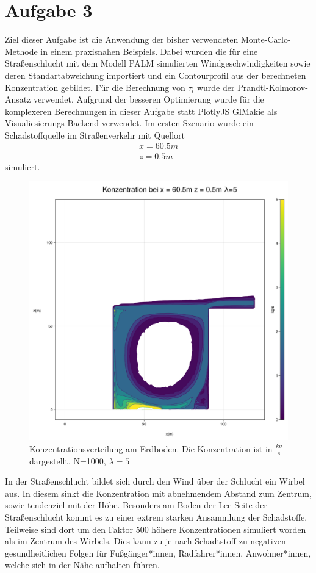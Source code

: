 \documentclass[ngerman]{scrartcl}
\begin{document}
\section{Aufgabe  3}
Ziel dieser Aufgabe ist die Anwendung der bisher verwendeten Monte-Carlo-Methode in einem praxisnahen Beispiels. Dabei wurden die für eine Straßenschlucht mit dem Modell PALM simulierten Windgeschwindigkeiten sowie deren Standartabweichung importiert und ein Contourprofil aus der berechneten Konzentration gebildet. Für die Berechnung von $\tau_l$ wurde der Prandtl-Kolmorov-Ansatz verwendet. Aufgrund der besseren Optimierung wurde für die komplexeren Berechnungen in dieser Aufgabe statt PlotlyJS  GlMakie als Visualiesierungs-Backend verwendet.
Im ersten Szenario wurde ein Schadstoffquelle im Straßenverkehr mit Quellort 
\begin{align}
	x=60.5 \si{m} \\
	z= 0.5 \si{m} 
\end{align}
simuliert.
\begin{figure}[H]
	\centering
	\includegraphics[scale=0.25]{Bilder/3_single_x = 60.5.png}
	\caption{Konzentrationsverteilung am Erdboden. Die Konzentration ist in $\frac{\si{kg}}{\si{s}}$ dargestellt. N=1000, $\lambda =5$}
	\label{fig:my_label}
\end{figure}
In der Straßenschlucht bildet sich durch den Wind über der Schlucht ein Wirbel aus. In diesem sinkt die Konzentration mit abnehmendem Abstand zum Zentrum, sowie tendenziel mit der Höhe. Besonders am Boden der Lee-Seite der Straßenschlucht kommt es zu einer extrem starken Ansammlung der Schadstoffe. Teilweise sind dort um den Faktor 500 höhere Konzentrationen simuliert worden als im Zentrum des Wirbels. Dies kann zu je nach Schadtstoff zu negativen gesundheitlichen Folgen für Fußgänger*innen, Radfahrer*innen, Anwohner*innen, welche sich in der Nähe aufhalten führen.
\end{document}
